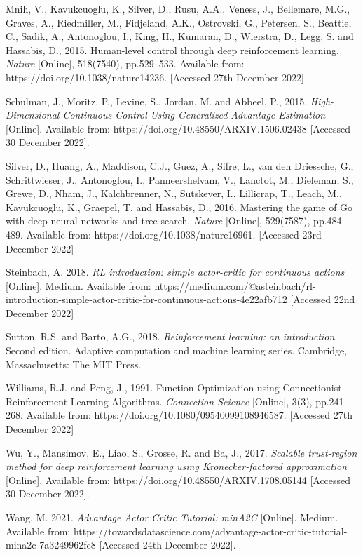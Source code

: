 \documentclass{article}
\begin{document}
Mnih, V., Kavukcuoglu, K., Silver, D., Rusu, A.A., Veness, J., Bellemare, M.G., Graves, A., Riedmiller, M., Fidjeland, A.K., Ostrovski, G., Petersen, S., Beattie, C., Sadik, A., Antonoglou, I., King, H., Kumaran, D., Wierstra, D., Legg, S. and Hassabis, D., 2015. Human-level control through deep reinforcement learning. \emph{Nature} [Online], 518(7540), pp.529–533. Available from: https://doi.org/10.1038/nature14236. [Accessed 27th December 2022]

Schulman, J., Moritz, P., Levine, S., Jordan, M. and Abbeel, P., 2015. \emph{High-Dimensional Continuous Control Using Generalized Advantage Estimation}  [Online]. Available from: https://doi.org/10.48550/ARXIV.1506.02438 [Accessed 30 December 2022].

Silver, D., Huang, A., Maddison, C.J., Guez, A., Sifre, L., van den Driessche, G., Schrittwieser, J., Antonoglou, I., Panneershelvam, V., Lanctot, M., Dieleman, S., Grewe, D., Nham, J., Kalchbrenner, N., Sutskever, I., Lillicrap, T., Leach, M., Kavukcuoglu, K., Graepel, T. and Hassabis, D., 2016. Mastering the game of Go with deep neural networks and tree search. \emph{Nature} [Online], 529(7587), pp.484–489. Available from: https://doi.org/10.1038/nature16961. [Accessed 23rd December 2022]

Steinbach, A. 2018. \emph{RL introduction: simple actor-critic for continuous actions} [Online]. Medium. Available from: https://medium.com/@asteinbach/rl-introduction-simple-actor-critic-for-continuous-actions-4e22afb712 [Accessed 22nd December 2022]

Sutton, R.S. and Barto, A.G., 2018. \emph{Reinforcement learning: an introduction}. Second edition. Adaptive computation and machine learning series. Cambridge, Massachusetts: The MIT Press.

Williams, R.J. and Peng, J., 1991. Function Optimization using Connectionist Reinforcement Learning Algorithms. \emph{Connection Science} [Online], 3(3), pp.241–268. Available from: https://doi.org/10.1080/09540099108946587. [Accessed 27th December 2022]

Wu, Y., Mansimov, E., Liao, S., Grosse, R. and Ba, J., 2017. \emph{Scalable trust-region method for deep reinforcement learning using Kronecker-factored approximation} [Online]. Available from: https://doi.org/10.48550/ARXIV.1708.05144 [Accessed 30 December 2022].

Wang, M. 2021. \emph{Advantage Actor Critic Tutorial: minA2C} [Online]. Medium. Available from: https://towardsdatascience.com/advantage-actor-critic-tutorial-mina2c-7a3249962fc8 [Accessed 24th December 2022].
\end{document}
